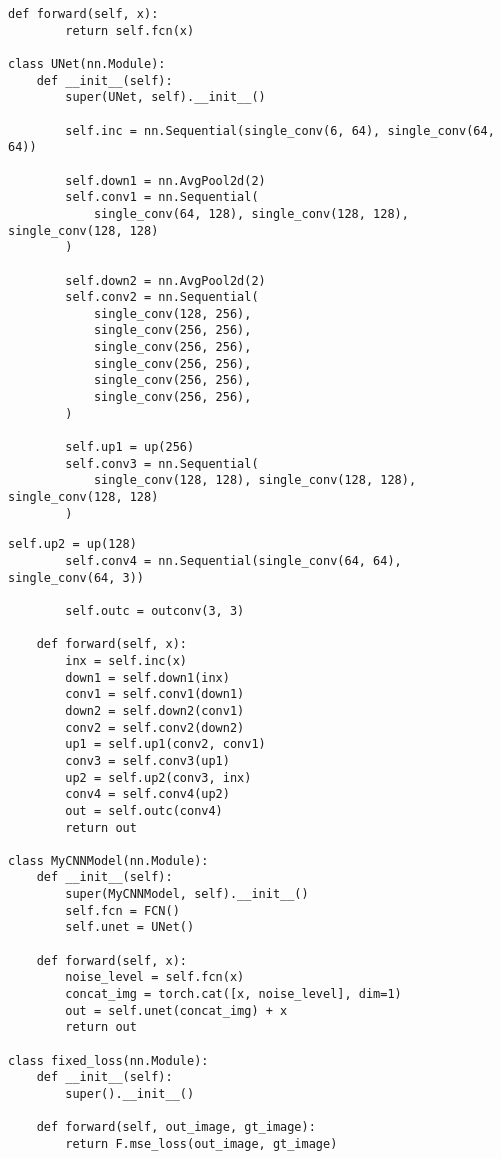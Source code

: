 \begin{appendices}
\begin{lstlisting}[caption={Модель нейронной сети (часть 2)}]
    def forward(self, x):
        return self.fcn(x)

class UNet(nn.Module):
    def __init__(self):
        super(UNet, self).__init__()

        self.inc = nn.Sequential(single_conv(6, 64), single_conv(64, 64))

        self.down1 = nn.AvgPool2d(2)
        self.conv1 = nn.Sequential(
            single_conv(64, 128), single_conv(128, 128), single_conv(128, 128)
        )

        self.down2 = nn.AvgPool2d(2)
        self.conv2 = nn.Sequential(
            single_conv(128, 256),
            single_conv(256, 256),
            single_conv(256, 256),
            single_conv(256, 256),
            single_conv(256, 256),
            single_conv(256, 256),
        )

        self.up1 = up(256)
        self.conv3 = nn.Sequential(
            single_conv(128, 128), single_conv(128, 128), single_conv(128, 128)
        )
\end{lstlisting}

\clearpage

\begin{lstlisting}[caption={Модель нейронной сети (часть 3)}]
        self.up2 = up(128)
        self.conv4 = nn.Sequential(single_conv(64, 64), single_conv(64, 3))

        self.outc = outconv(3, 3)

    def forward(self, x):
        inx = self.inc(x)
        down1 = self.down1(inx)
        conv1 = self.conv1(down1)
        down2 = self.down2(conv1)
        conv2 = self.conv2(down2)
        up1 = self.up1(conv2, conv1)
        conv3 = self.conv3(up1)
        up2 = self.up2(conv3, inx)
        conv4 = self.conv4(up2)
        out = self.outc(conv4)
        return out

class MyCNNModel(nn.Module):
    def __init__(self):
        super(MyCNNModel, self).__init__()
        self.fcn = FCN()
        self.unet = UNet()

    def forward(self, x):
        noise_level = self.fcn(x)
        concat_img = torch.cat([x, noise_level], dim=1)
        out = self.unet(concat_img) + x
        return out

class fixed_loss(nn.Module):
    def __init__(self):
        super().__init__()

    def forward(self, out_image, gt_image):
        return F.mse_loss(out_image, gt_image)
\end{lstlisting}


\end{appendices}
